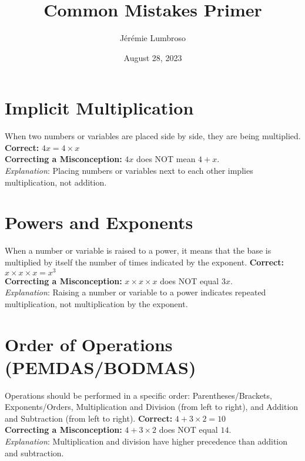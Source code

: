 \documentclass[12pt]{article}
\title{Common Mistakes Primer}
\author{Jérémie Lumbroso}
\date{August 28, 2023}
\newenvironment{correct}{\noindent\textbf{Correct:}}{\\}
\newenvironment{misconception}{\noindent\textbf{Correcting a Misconception:}}{\\}
\newenvironment{explanation}{\noindent\textit{Explanation}:}{\\\vspace{1em}}
\begin{document}
\maketitle

\section*{Implicit Multiplication}
When two numbers or variables are placed side by side, they are being multiplied.
\begin{correct} \(4x = 4 \times x\) \end{correct}
\begin{misconception} \(4x\) does NOT mean \(4 + x\). \end{misconception}
\begin{explanation} Placing numbers or variables next to each other implies multiplication, not addition. \end{explanation}

\section*{Powers and Exponents}
When a number or variable is raised to a power, it means that the base is multiplied by itself the number of times indicated by the exponent.
\begin{correct} \(x \times x \times x = x^3\) \end{correct}
\begin{misconception} \(x \times x \times x\) does NOT equal \(3x\). \end{misconception}
\begin{explanation} Raising a number or variable to a power indicates repeated multiplication, not multiplication by the exponent. \end{explanation}

\section*{Order of Operations (PEMDAS/BODMAS)}
Operations should be performed in a specific order: Parentheses/Brackets, Exponents/Orders, Multiplication and Division (from left to right), and Addition and Subtraction (from left to right).
\begin{correct} \(4 + 3 \times 2 = 10\) \end{correct}
\begin{misconception} \(4 + 3 \times 2\) does NOT equal \(14\). \end{misconception}
\begin{explanation} Multiplication and division have higher precedence than addition and subtraction. \end{explanation}
\end{document}
